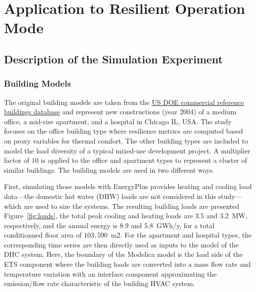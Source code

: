 \section{Application to Resilient Operation Mode} \label{sec:application}

\subsection{Description of the Simulation Experiment} \label{sec:experiment}

\subsubsection{Building Models} \label{sec:buildings}

The original building models are taken from the \href{https://www.energy.gov/eere/buildings/commercial-reference-buildings}{US DOE commercial reference buildings database} and represent new constructions (year 2004) of a medium office, a mid-rise apartment, and a hospital in Chicago IL, USA.
The study focuses on the office building type where resilience metrics are computed based on proxy variables for thermal comfort. The other building types are included to model the load diversity of a typical mixed-use development project.
A multiplier factor of $10$ is applied to the office and apartment types to represent a cluster of similar buildings.
The building models are used in two different ways.

First, simulating those models with EnergyPlus provides heating and cooling load data---the domestic hot water (DHW) loads are not considered in this study---which are used to size the systems.
The resulting building loads are presented Figure~\ref{fig:loads}, the total peak cooling and heating loads are $3.5$ and $3.2$~MW, respectively, and the annual energy is $8.9$ and $5.8$~GWh/y, for a total conditionned floor area of $103,590$~m2.
For the apartment and hospital types, the corresponding time series are then directly used as inputs to the model of the DHC system.
Here, the boundary of the Modelica model is the load side of the ETS component where the building loads are converted into a mass flow rate and temperature variation with an interface component approximating the emission/flow rate characteristic of the building HVAC system.

